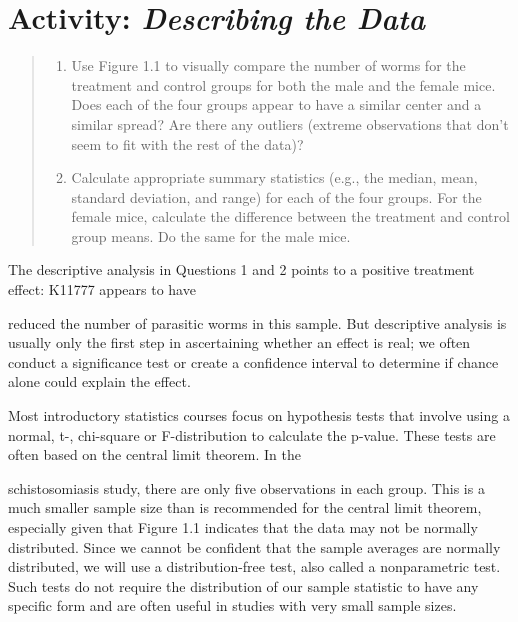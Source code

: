 \documentclass[
]{report}
\providecommand{\tightlist}{%
  \setlength{\itemsep}{0pt}\setlength{\parskip}{0pt}}
\theoremstyle{definition}
\theoremstyle{definition}
\theoremstyle{definition}
\theoremstyle{definition}
\theoremstyle{remark}
\begin{document}
\hypertarget{activity-describing-the-data}{%
\section*{\texorpdfstring{Activity: \emph{Describing the Data}}{Activity: Describing the Data}}\label{activity-describing-the-data}}

\begin{quote}
\begin{enumerate}
\def\labelenumi{\arabic{enumi}.}
\tightlist
\item
  Use Figure 1.1 to visually compare the number of worms for the treatment and control groups for both
  the male and the female mice. Does each of the four groups appear to have a similar center and a similar
  spread? Are there any outliers (extreme observations that don't seem to fit with the rest of the data)?
\item
  Calculate appropriate summary statistics (e.g., the median, mean, standard deviation, and range) for
  each of the four groups. For the female mice, calculate the difference between the treatment and control
  group means. Do the same for the male mice.
\end{enumerate}
\end{quote}

The descriptive analysis in Questions 1 and 2 points to a positive treatment effect: K11777 appears to have

reduced the number of parasitic worms in this sample. But descriptive analysis is usually only the first step
in ascertaining whether an effect is real; we often conduct a significance test or create a confidence interval
to determine if chance alone could explain the effect.

Most introductory statistics courses focus on hypothesis tests that involve using a normal, t-, chi-square or F-distribution to calculate the p-value. These tests are often based on the central limit theorem. In the

schistosomiasis study, there are only five observations in each group. This is a much smaller sample size
than is recommended for the central limit theorem, especially given that Figure 1.1 indicates that the data
may not be normally distributed. Since we cannot be confident that the sample averages are normally distributed,
we will use a distribution-free test, also called a nonparametric test. Such tests do not require
the distribution of our sample statistic to have any specific form and are often useful in studies with very
small sample sizes.
\end{document}
